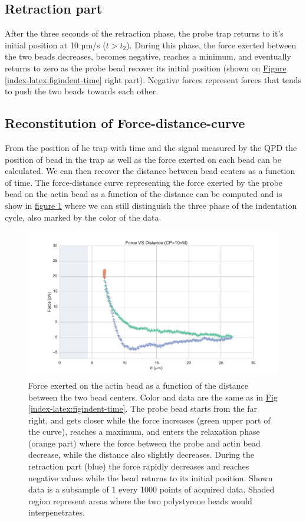 \documentclass[A4paperpaper,11pt,english]{sphinxmanual}
\begin{document}
\subsection{Retraction part}
\label{index-latex:retraction-part}
After the three seconds of the retraction phase, the probe trap returns to it's
initial position at 10 µm/s (\(t > t_2\)). During this phase, the force
exerted between the two beads decreases, becomes negative, reaches a minimum, and
eventually returns to zero as the probe bead recover its initial
position (shown on \hyperref[index-latex:figindent-time]{Figure  \ref*{index-latex:figindent-time}} right part). Negative forces
represent forces that tends to push the two beads towards each other.


\subsection{Reconstitution of Force-distance-curve}
\label{index-latex:reconstitution-of-force-distance-curve}
From the position of he trap with time and the signal measured by the QPD the
position of bead in the trap as well as the force exerted on each bead can be
calculated. We can then recover the distance between bead centers as a function
of time.  The force-distance curve representing the force exerted by the
probe bead on the actin bead as a function of the distance can be computed and is
show in \hyperref[index-latex:force-distance]{figure  \ref*{index-latex:force-distance}} where we can still distinguish the three
phase of the indentation cycle, also marked by the color of the data.
\begin{figure}[htbp]
\centering
\capstart

\includegraphics[width=0.800\linewidth]{force-distance.pdf}
\caption{Force exerted on the actin bead as a function of the distance between the
two bead centers. Color and data are the same as in \hyperref[index-latex:figindent-time]{Fig  \ref*{index-latex:figindent-time}}.
The probe bead starts from the far right, and gets closer
while the force increases (green upper part of the curve), reaches a
maximum, and enters the relaxation phase (orange part) where the force
between the probe and actin bead decrease, while the distance  also
slightly decreases. During the retraction part (blue) the force rapidly
decreases and  reaches negative values while the bead returns to its initial
position. Shown data is a subsample of 1 every 1000 points of acquired
data. Shaded region represent areas where the two polystyrene beads would
interpenetrates.}\label{index-latex:force-distance}\end{figure}
\end{document}
